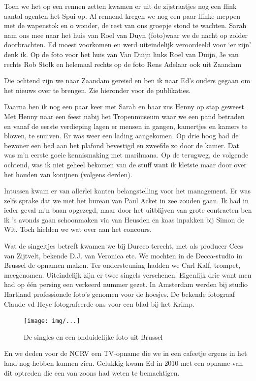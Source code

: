 \documentclass[12pt,twoside]{memoir}
\begin{document}
Toen we het op een rennen zetten kwamen er uit de zijstraatjes nog een flink aantal agenten het Spui op. Al rennend kregen we nog een paar flinke meppen met de wapenstok en o wonder, de rest van ons groepje stond te wachten. Sarah nam ons mee naar het huis van Roel van Duyn (foto)waar we de nacht op zolder doorbrachten. Ed moest voorkomen en werd uiteindelijk veroordeeld voor ‘er zijn’ denk ik. Op de foto voor het huis van Van Duijn links Roel van Duijn, 3e van rechts Rob Stolk en helemaal rechts op de foto Rens Adelaar ook uit Zaandam

Die ochtend zijn we naar Zaandam gereisd en ben ik naar Ed’s ouders gegaan om het nieuws over te brengen. Zie hieronder voor de publikaties.

Daarna ben ik nog een paar keer met Sarah en haar zus Henny op stap geweest. Met Henny naar een feest nabij het Tropenmuseum waar we een pand betraden en vanaf de eerste verdieping lagen er mensen in gangen, kamertjes en kamers te blowen, te snuiven. Er was weer een lading aangekomen. Op drie hoog had de bewoner een bed aan het plafond bevestigd en zweefde zo door de kamer. Dat was m’n eerste goeie kennismaking met marihuana. Op de terugweg, de volgende ochtend, was ik niet geheel bekomen van de stuff want ik kletste maar door over het houden van konijnen (volgens derden).

Intussen kwam er van allerlei kanten belangstelling voor het management. Er was zelfs sprake dat we met het bureau van Paul Acket in zee zouden gaan. Ik had in ieder geval m’n baan opgezegd, maar door het uitblijven van grote contracten ben ik ’s avonds gaan schoonmaken via van Heusden en kaas inpakken bij Simon de Wit. Toch hielden we wat over aan het concours.

Wat de singeltjes betreft kwamen we bij Dureco terecht, met als producer Cees van Zijtvelt, bekende D.J. van Veronica etc. We mochten in de Decca-studio in Brussel de opnamen maken. Ter ondersteuning hadden we Carl Kalf, trompet, meegenomen. Uiteindelijk zijn er twee singels verschenen. Eigenlijk drie want men had op één persing een verkeerd nummer gezet. In Amsterdam werden bij studio Hartland professionele foto’s genomen voor de hoesjes. De bekende fotograaf Claude vd Heye fotografeerde ons voor een blad bij het Krimp.

\begin{figure}[t]
\texttt{[image: img/...]}
\caption{De singles en een onduidelijke foto uit Brussel}
\end{figure}

En we deden voor de NCRV een TV-opname die we in een cafeetje ergens in het land nog hebben kunnen zien. Gelukkig kwam Ed in 2010 met een opname van dit optreden die een van zoons had weten te bemachtigen.
\end{document}
